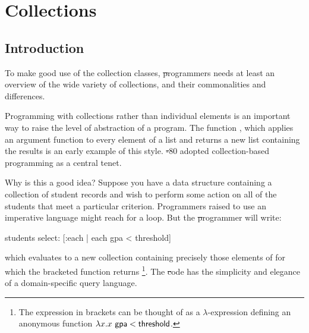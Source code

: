 \documentclass[a4paper,10pt,twoside]{book}
\begin{document}
	\renewcommand{\nnbb}[2]{} %
	\sloppy
\fi
\chapter{Collections}
\label{cha:collections}

\section{Introduction}

To make good use of the collection classes, \st programmers needs at least an overview of the wide variety of collections, and their commonalities and differences.

Programming with collections rather than individual elements is an important way to raise the level of abstraction of a program. 
The  function , which applies an argument function to every element of a list and returns a new list containing the results is an early example of this style. \st-80 adopted collection-based programming as a central tenet.


Why is this a good idea?
Suppose you have a data structure containing a collection of student records and wish to perform some action on all of the students that meet a particular criterion.
Programmers raised to use an imperative language might reach for a loop.
But the \st programmer will write:
\begin{code}{}
students select: [:each | each gpa < threshold]
\end{code}
\noindent
which evaluates to a new collection containing precisely those elements of  for which the bracketed function returns \footnote{The expression in brackets can be thought of as a $\lambda$-expression defining an anonymous function $\lambda x. x~{\sf gpa} < {\sf threshold}$.
}.
The \st code has the simplicity and elegance of a domain-specific query language.
\end{document}
